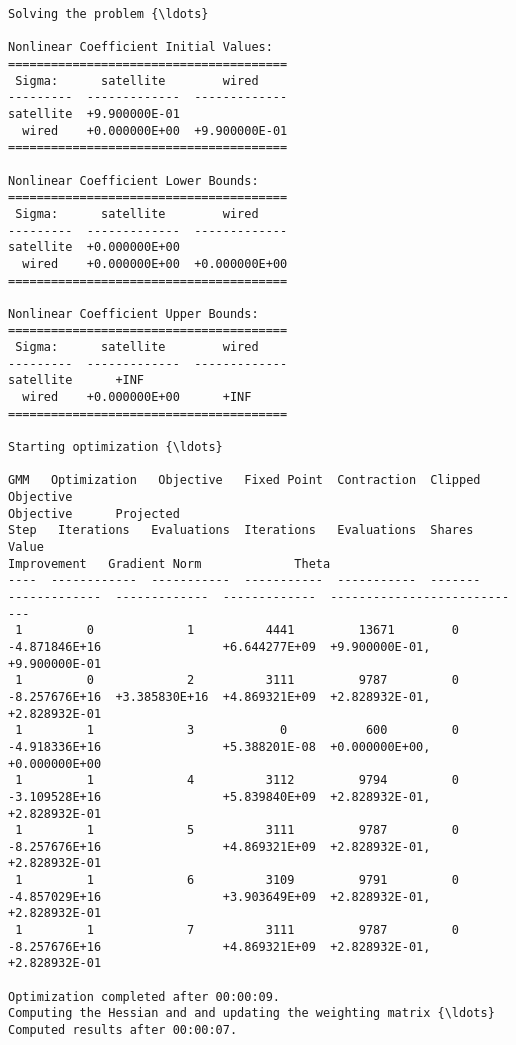     \begin{Verbatim}[commandchars=\\\{\}]
Solving the problem {\ldots}

Nonlinear Coefficient Initial Values:
=======================================
 Sigma:      satellite        wired
---------  -------------  -------------
satellite  +9.900000E-01
  wired    +0.000000E+00  +9.900000E-01
=======================================

Nonlinear Coefficient Lower Bounds:
=======================================
 Sigma:      satellite        wired
---------  -------------  -------------
satellite  +0.000000E+00
  wired    +0.000000E+00  +0.000000E+00
=======================================

Nonlinear Coefficient Upper Bounds:
=======================================
 Sigma:      satellite        wired
---------  -------------  -------------
satellite      +INF
  wired    +0.000000E+00      +INF
=======================================

Starting optimization {\ldots}

GMM   Optimization   Objective   Fixed Point  Contraction  Clipped    Objective
Objective      Projected
Step   Iterations   Evaluations  Iterations   Evaluations  Shares       Value
Improvement   Gradient Norm             Theta
----  ------------  -----------  -----------  -----------  -------
-------------  -------------  -------------  ----------------------------
 1         0             1          4441         13671        0
-4.871846E+16                 +6.644277E+09  +9.900000E-01, +9.900000E-01
 1         0             2          3111         9787         0
-8.257676E+16  +3.385830E+16  +4.869321E+09  +2.828932E-01, +2.828932E-01
 1         1             3            0           600         0
-4.918336E+16                 +5.388201E-08  +0.000000E+00, +0.000000E+00
 1         1             4          3112         9794         0
-3.109528E+16                 +5.839840E+09  +2.828932E-01, +2.828932E-01
 1         1             5          3111         9787         0
-8.257676E+16                 +4.869321E+09  +2.828932E-01, +2.828932E-01
 1         1             6          3109         9791         0
-4.857029E+16                 +3.903649E+09  +2.828932E-01, +2.828932E-01
 1         1             7          3111         9787         0
-8.257676E+16                 +4.869321E+09  +2.828932E-01, +2.828932E-01

Optimization completed after 00:00:09.
Computing the Hessian and and updating the weighting matrix {\ldots}
Computed results after 00:00:07.


\end{Verbatim}
